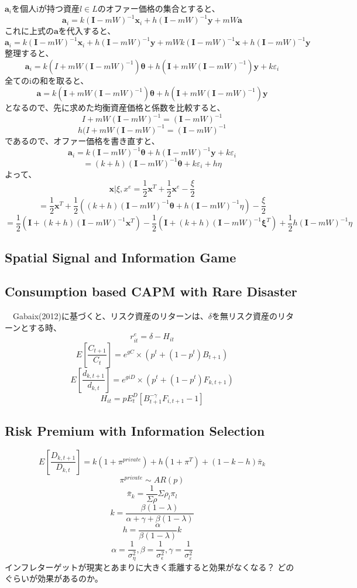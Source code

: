 \documentclass{jsarticle}
\begin{document}
$\bm{a}_{i}$を個人iが持つ資産$l\in L$のオファー価格の集合とすると、
$$\bm{a}_{i} = k(\bm{I} - mW)^{-1}\bm{x}_{i} + h(\bm{I} - mW)^{-1}\bm{y} + mW\bm{a}
$$
これに上式の$\bm{a}$を代入すると、
$$\bm{a}_{i} = k(\bm{I} - mW)^{-1}\bm{x}_{i} + h(\bm{I} - mW)^{-1}\bm{y} + mWk(\bm{I} - mW)^{-1}\bm{x} + h(\bm{I} - mW)^{-1}\bm{y}
$$
整理すると、
$$\bm{a}_{i} = k(I+mW(\bm{I} - mW)^{-1})\bm{\theta} + h(\bm{I}+mW(\bm{I} - mW)^{-1})\bm{y} + k\varepsilon_{i}
$$
全てのiの和を取ると、
$$\bm{a} = k(\bm{I}+mW(\bm{I} - mW)^{-1})\bm{\theta} + h(\bm{I}+mW(\bm{I} - mW)^{-1})\bm{y}
$$
となるので、先に求めた均衡資産価格と係数を比較すると、
$$I+mW(\bm{I} - mW)^{-1} = (\bm{I} - mW)^{-1}$$
$$h(I+mW(\bm{I} - mW)^{-1}= (\bm{I} - mW)^{-1} $$
であるので、オファー価格を書き直すと、
$$\bm{a}_{i} = k(\bm{I} - mW)^{-1}\bm{\theta} + h(\bm{I} - mW)^{-1}\bm{y} + k\varepsilon_{i}$$
$$ = (k + h)(\bm{I} - mW)^{-1}\bm{\theta} + k\varepsilon_{i} + h\eta $$
よって、
$$ \bm{x}|\xi, x^{e} = \frac{1}{2}\bm{x}^{T} + \frac{1}{2}\bm{x}^{e} -\frac{\xi}{2}$$
$$ = \frac{1}{2}\bm{x}^{T} + \frac{1}{2}((k + h)(\bm{I} - mW)^{-1}\bm{\theta} +  h(\bm{I} - mW)^{-1}\eta) -\frac{\xi}{2}$$
$$ = \frac{1}{2}(\bm{I} + (k + h)(\bm{I} - mW)^{-1}\bm{x}^{T}) - \frac{1}{2}(\bm{I} + (k + h)(\bm{I} - mW)^{-1}\bm{\xi}^{T}) + \frac{1}{2}h(\bm{I} - mW)^{-1}\eta $$


\subsection{Spatial Signal and Information Game}


\subsection{Consumption based CAPM with Rare Disaster}
　Gabaix(2012)に基づくと、リスク資産のリターンは、$\delta$を無リスク資産のリターンとする時、
$$r^{e}_{it} = \delta - H_{it}$$
$$ E[\frac{C_{t+1}}{C_{t}}] = e^{gC}\times (p^{t} +  (1-p^{t}) B_{t+1}) $$
$$ E[\frac{d_{k, t+1}}{d_{k, t}}] = e^{giD}\times (p^{t} +  (1-p^{t})F_{k, t+1}) $$
$$ H_{it} = pE^{D}_{t}[B^{-\gamma}_{t+1}F_{i, t+1} - 1]$$

\subsection{Risk Premium with Information Selection}
$$ E[\frac{D_{k, t+1}}{D_{k, t}}] = k(1+\pi^{private}) + h(1+\pi^{T}) + (1 - k - h)\bar{\pi}_{k}$$
$$ \pi^{private} \sim AR(p) $$
$$ \bar{\pi}_{k} = \frac{1}{\Sigma \rho} \Sigma \rho_{l} \pi_{l} $$
$$ k = \frac{\beta(1-\lambda)}{\alpha + \gamma + \beta(1-\lambda)} $$
$$ h = \frac{\alpha}{\beta(1-\lambda)}k$$
$$ \alpha = \frac{1}{\sigma^{2}_{\eta}}, \beta = \frac{1}{\sigma^{2}_{\epsilon}}, \gamma = \frac{1}{\sigma^{2}_{\varepsilon}} $$
インフレターゲットが現実とあまりに大きく乖離すると効果がなくなる？
どのぐらいが効果があるのか。
\end{document}
